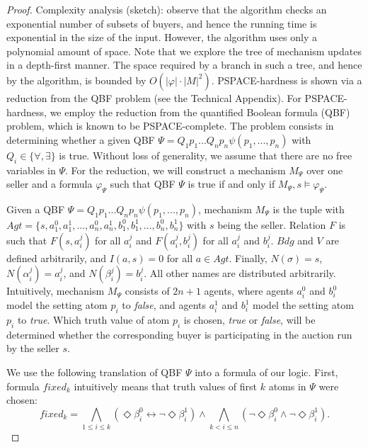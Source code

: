 \documentclass[letterpaper]{article} %
\theoremstyle{definition}
\begin{document}
\begin{proof}
Complexity analysis (sketch): observe that the algorithm checks an exponential number of subsets of buyers, and hence the running time is exponential in the size of the input. However, the algorithm uses only a polynomial amount of space. %
Note that we explore the tree of mechanism updates in a depth-first manner.  %
The space required by a branch in such a tree, and hence by the algorithm, is bounded by $O(|\varphi|\cdot |M|^2)$. PSPACE-hardness is shown via a reduction from the QBF problem (see the Technical Appendix).
\iffalse
    For PSPACE-hardness, we employ the reduction from the quantified Boolean formula (QBF) problem, which is known to be PSPACE-complete. The problem consists in determining whether a given QBF $\Psi = Q_1 p_1 ... Q_n p_n \psi(p_1,...,p_n)$ with $Q_i \in \{\forall, \exists\}$ is true. Without loss of generality, we assume that there are no free variables in $\Psi$. For the reduction, we will construct a mechanism $M_\Psi$ over one seller and a formula $\varphi_\Psi$ such that QBF $\Psi$ is true if and only if $M_\Psi, s \models \varphi_\Psi$. 

    Given a QBF $\Psi = Q_1 p_1 ... Q_n p_n \psi(p_1,...,p_n)$, mechanism $M_\Psi$ is the tuple with $Agt = \{s, a_1^0,a_1^1, ..., a_n^0, a_n^1, b_1^0, b_1^1, ..., b_n^0, b_n^1\}$ with $s$ being the seller. Relation $F$ is such that $F(s, a_i^j)$ for all $a_i^j$ and $F(a_i^j,b_i^j)$ for all $a_i^j$ and $b_i^j$. $Bdg$ and $V$ are defined arbitrarily, and $I(a,s) = 0$ for all $a \in Agt$. Finally, $N(\sigma) = s$, $N(\alpha_i^j) = a^j_i$,  and $N(\beta_i^j) = b^j_i$. All other names are distributed arbitrarily. Intuitively, mechanism $M_\Psi$ consists of $2n+1$ agents, where agents $a^0_i$ and $b^0_i$ model the setting atom $p_i$ to \textit{false}, and agents $a^1_i$ and $b^1_i$ model the setting atom $p_i$ to \textit{true}. Which truth value of atom $p_i$ is chosen, \textit{true} or \textit{false}, will be determined whether the corresponding buyer is participating in the auction run by the seller $s$.

    We use the following translation of QBF $\Psi$ into a formula of our logic. First, formula $fixed_k$ intuitively means that truth values of first $k$ atoms in $\Psi$ were chosen:
    $$fixed_k = \bigwedge_{1 \leqslant i \leqslant k} (\Diamond \beta_i^0 \leftrightarrow \lnot \Diamond \beta_i^1) \land \bigwedge_{k < i \leqslant n} (\lnot \Diamond \beta^0_i \land \lnot \Diamond \beta^1_i).$$


\end{proof}
\end{document}
